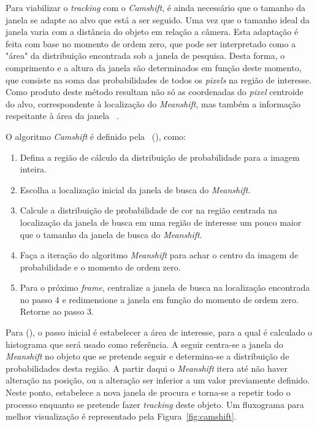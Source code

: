 Para viabilizar o \textit{tracking} com o \textit{Camshift}, é ainda necessário que o tamanho da janela se adapte ao alvo que está a ser seguido. Uma vez que o tamanho ideal da janela varia com a distância do objeto em relação a câmera. Esta adaptação é feita com base no momento de ordem zero, que pode ser interpretado como a "área" da distribuição encontrada sob a janela de pesquisa. Desta forma, o comprimento e a altura da janela são determinados em função deste momento, que consiste na soma das probabilidades de todos os \textit{pixels} na região de interesse. Como produto deste método resultam não só as coordenadas do \textit{pixel} centroide do alvo, correspondente à localização do \textit{Meanshift}, mas também a informação respeitante à área da janela ~\cite{peixoto2012deteccao}.

O algoritmo \textit{Camshift} é definido pela~\citeauthor{intel2001corporation} (\citeyear{intel2001corporation}), como:

\begin{enumerate}
    \item Defina a região de cálculo da distribuição de probabilidade para a imagem inteira.
    \item Escolha a localização inicial da janela de busca do \textit{Meanshift}.
    \item Calcule a distribuição de probabilidade de cor na região centrada na localização da janela de busca em uma região de interesse um pouco maior que o tamanho da janela de busca do \textit{Meanshift}.
    \item Faça a iteração do algoritmo \textit{Meanshift} para achar o centro da imagem de probabilidade e o momento de ordem zero.
    \item Para o próximo \textit{frame}, centralize a janela de busca na localização encontrada no passo 4 e redimensione a janela em função do momento de ordem zero. Retorne ao passo 3.
\end{enumerate}

Para \citeauthor{peixoto2012deteccao} (\citeyear{peixoto2012deteccao}), o passo inicial é estabelecer a área de interesse, para a qual é calculado o histograma que será usado como referência. A seguir centra-se a janela do \textit{Meanshift} no objeto que se pretende seguir e determina-se a distribuição de probabilidades desta região. A partir daqui o \textit{Meanshift} itera até não haver alteração na posição, ou a alteração ser inferior a um valor previamente definido. Neste ponto, estabelece a nova janela de procura e torna-se a repetir todo o processo enquanto se pretende fazer \textit{tracking} deste objeto. Um fluxograma para melhor visualização é representado pela Figura~\ref{fig:camshift}.


